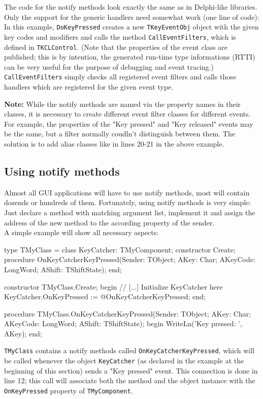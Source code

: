 The code for the notify methods look exactly the same as in Delphi-like
libraries. Only the support for the generic handlers need somewhat work
(one line of code): In this example, \texttt{DoKeyPressed} creates a new
\texttt{TKeyEventObj} object with the given key codes and modifiers and calls
the method \texttt{CallEventFilters}, which is defined in \texttt{TKCLControl}.
(Note that the properties of the event class are published; this is by
intention, the generated run-time type informations (RTTI) can be very useful
for the purpose of debugging and event tracing.)
\texttt{CallEventFilters} simply checks all registered event filters and calls
those handlers which are registered for the given event type.\\
{\textbf{Note:} While the notify methods are named via the property names in
their classes, it is necessary to create different event filter classes for
different events. For example, the properties of the "Key pressed" and "Key
released" events may be the same, but a filter normally coudln't distinguish
between them. The solution is to add alias classes like in lines 20-21 in the
above example.

\subsection{Using notify methods}
Almost all GUI applications will have to use notify methods, most will
contain dozends or hundreds of them. Fortunately, using notify methods
is very simple: Just declare a method with matching argument list, implement
it and assign the address of the new method to the according property of the
sender.\\
A simple example will show all necessary aspects:
\small
\begin{listing}{1}
type
  TMyClass = class
    KeyCatcher: TMyComponent;
    constructor Create;
    procedure OnKeyCatcherKeyPressed(Sender: TObject; AKey: Char;
      AKeyCode: LongWord; AShift: TShiftState);
  end;

  constructor TMyClass.Create;
  begin
    // [...] Initialize KeyCatcher here
    KeyCatcher.OnKeyPressed := @OnKeyCatcherKeyPressed;
  end;

  procedure TMyClass.OnKeyCatcherKeyPressed(Sender: TObject;
    AKey: Char; AKeyCode: LongWord; AShift: TShiftState);
  begin
    WriteLn('Key pressed: ', AKey);
  end;
\end{listing}
\normalsize

\texttt{TMyClass} contains a notify methods called
\texttt{OnKeyCatcherKeyPressed}, which will be called whenever the object
\texttt{KeyCatcher} (as declared in the example at the beginning of this
section) sends a "Key pressed" event. This connection is done in line 12; this
call will associate both the method and the object instance with the
\texttt{OnKeyPressed} property of \texttt{TMyComponent}.

}

